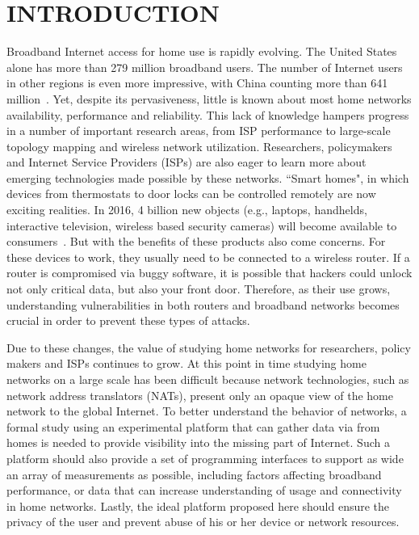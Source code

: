 \chapter{INTRODUCTION}
\label{sec.introduction}
Broadband Internet access for home use is rapidly evolving. The United States
alone has more than 279 million broadband users. The number of Internet 
users in other regions is even more impressive, with China counting more 
than 641 million~\cite{asia}. Yet, despite its pervasiveness, little is 
known about most home networks availability, performance and reliability. This lack of knowledge hampers progress in a number of important research 
areas, from ISP performance to large-scale
topology mapping and wireless network utilization. Researchers, policymakers 
and Internet Service Providers (ISPs) are also eager to learn more about 
emerging technologies made possible by these networks. ``Smart homes", in 
which devices from thermostats to door locks can be controlled remotely are
 now exciting realities. In 2016, 4 billion new objects (e.g., laptops, 
handhelds, interactive television, wireless based security cameras) will 
become available to consumers~\cite{gartner}. But with the benefits of these 
products also come concerns. For these devices to work, they usually need to 
be connected to a wireless router. If a router is compromised via buggy 
software, it is possible that hackers could unlock not only critical data, 
but also your front door. Therefore, as their use grows, understanding 
vulnerabilities in both routers and broadband networks becomes crucial in 
order to prevent these types of attacks.

Due to these changes, the value of studying home networks for researchers, 
policy makers and ISPs continues to grow. At this point in time studying 
home networks on a large scale has been difficult because network 
technologies, such as network address translators (NATs), present only an 
opaque view of the home network to the global Internet. To better understand 
the behavior of networks, a formal study using an experimental platform that 
can gather data via from homes  is needed to provide visibility into the 
missing part of Internet. Such a platform should also provide a set of 
programming interfaces to support as wide an array of measurements as 
possible, including factors affecting broadband performance, or data that 
can increase understanding of usage and connectivity in home networks.
Lastly, the ideal platform proposed here should ensure the privacy of the 
user and prevent abuse of his or her device or network resources.

